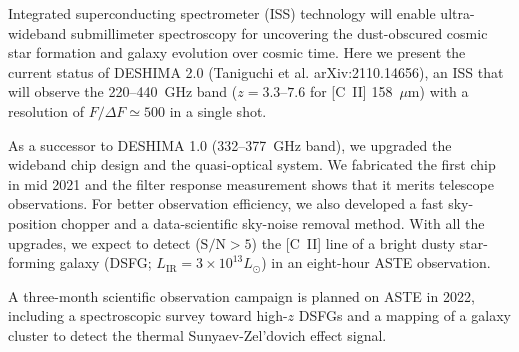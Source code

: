 \documentclass[ja]{2022a}
\begin{document}
Integrated superconducting spectrometer (ISS) technology will enable ultra-wideband submillimeter spectroscopy for uncovering the dust-obscured cosmic star formation and galaxy evolution over cosmic time.
Here we present the current status of DESHIMA 2.0 (Taniguchi et al. arXiv:2110.14656), an ISS that will observe the 220--440~GHz band ($z=3.3\textrm{--}7.6$ for [C~II] 158~$\mu$m) with a resolution of $F / \Delta F \simeq 500$ in a single shot.

As a successor to DESHIMA 1.0 (332--377~GHz band), we upgraded the wideband chip design and the quasi-optical system.
We fabricated the first chip in mid 2021 and the filter response measurement shows that it merits telescope observations.
For better observation efficiency, we also developed a fast sky-position chopper and a data-scientific sky-noise removal method.
With all the upgrades, we expect to detect ($\textrm{S/N}>5$) the [C~II] line of a bright dusty star-forming galaxy (DSFG; $L_{\mathrm{IR}} = 3 \times 10^{13} L_{\odot}$) in an eight-hour ASTE observation.

A three-month scientific observation campaign is planned on ASTE in 2022, including a spectroscopic survey toward high-$z$ DSFGs and a mapping of a galaxy cluster to detect the thermal Sunyaev-Zel'dovich effect signal.
\end{document}
